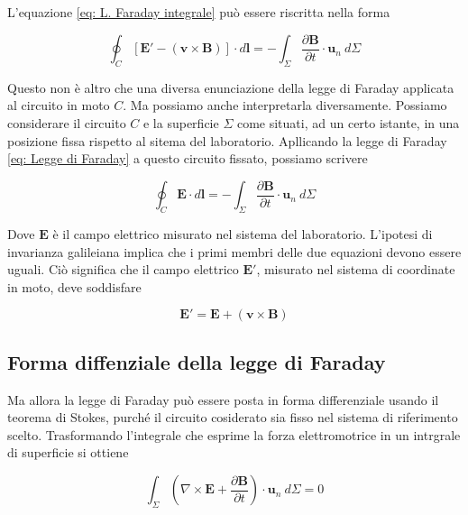 L'equazione \ref{eq: L. Faraday integrale} può essere riscritta nella forma 

\begin{equation}
    \oint_C \left[ \mathbf{E'} - (\mathbf{v} \times \mathbf{B}) \right] \cdot d \mathbf{l} = - \int_{\Sigma} \frac{\partial \mathbf{B}}{\partial t} \cdot \mathbf{u}_n \ d\Sigma
\end{equation} 

Questo non è altro che una diversa enunciazione della legge di Faraday applicata al circuito in moto $C$. Ma possiamo anche interpretarla diversamente. Possiamo considerare il circuito $C$ e la superficie $\Sigma$ come situati, ad un certo istante, in una posizione fissa rispetto al sitema del laboratorio. Apllicando la legge di Faraday \ref{eq: Legge di Faraday} a questo circuito fissato, possiamo scrivere

\begin{equation}
    \oint_C \mathbf{E} \cdot d \mathbf{l} = - \int_{\Sigma} \frac{\partial \mathbf{B}}{\partial t} \cdot \mathbf{u}_n \ d\Sigma 
\end{equation}

Dove $\mathbf{E}$ è il campo elettrico misurato nel sistema del laboratorio. L'ipotesi di invarianza galileiana implica che i primi membri delle due equazioni devono essere uguali. 
Ciò significa che il campo elettrico $\mathbf{E}'$, misurato nel sistema di coordinate in moto, deve soddisfare 

\begin{tcolorbox}[colback=yellow!10!white, colframe=orange!70!black, boxrule=0.8pt]
\begin{equation} 
    \mathbf{E}' = \mathbf{E} + (\mathbf{v} \times \mathbf{B})
\end{equation}
\end{tcolorbox}

\subsection{Forma diffenziale della legge di Faraday}

Ma allora la legge di Faraday può essere posta in forma differenziale  usando il teorema di Stokes, purché il circuito cosiderato sia fisso nel sistema di riferimento scelto. Trasformando l'integrale che esprime la forza elettromotrice in un intrgrale di superficie si ottiene

\begin{equation}
    \int_{\Sigma} \left( \nabla \times \mathbf{E} + \frac{\partial \mathbf{B}}{\partial t}  \right) \cdot \mathbf{u}_n \ d\Sigma = 0
\end{equation}

